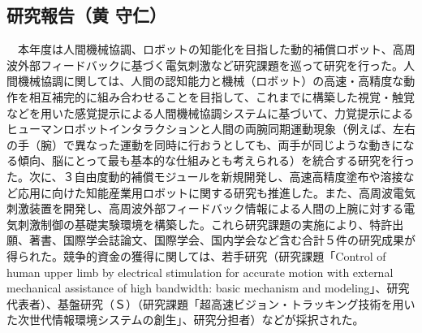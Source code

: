 \subsection{研究報告（黄 守仁）}
　本年度は人間機械協調、ロボットの知能化を目指した動的補償ロボット、高周波外部フィードバックに基づく電気刺激など研究課題を巡って研究を行った。人間機械協調に関しては、人間の認知能力と機械（ロボット）の高速・高精度な動作を相互補完的に組み合わせることを目指して、これまでに構築した視覚・触覚などを用いた感覚提示による人間機械協調システムに基づいて、力覚提示によるヒューマンロボットインタラクションと人間の両腕同期運動現象（例えば、左右の手（腕）で異なった運動を同時に行おうとしても、両手が同じような動きになる傾向、脳にとって最も基本的な仕組みとも考えられる）を統合する研究を行った。次に、３自由度動的補償モジュールを新規開発し、高速高精度塗布や溶接など応用に向けた知能産業用ロボットに関する研究も推進した。また、高周波電気刺激装置を開発し、高周波外部フィードバック情報による人間の上腕に対する電気刺激制御の基礎実験環境を構築した。これら研究課題の実施により、特許出願、著書、国際学会誌論文、国際学会、国内学会など含む合計５件の研究成果が得られた。競争的資金の獲得に関しては、若手研究（研究課題「Control of human upper limb by electrical stimulation for accurate motion with external mechanical assistance of high bandwidth: basic mechanism and modeling」、研究代表者）、基盤研究（Ｓ）（研究課題「超高速ビジョン・トラッキング技術を用いた次世代情報環境システムの創生」、研究分担者）などが採択された。